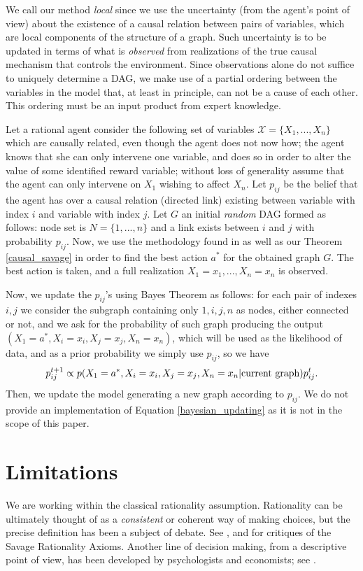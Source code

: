 \documentclass[review]{elsarticle}
\begin{document}
We call our method \textit{local} since we use the uncertainty (from the agent's point of view) about the existence of a causal relation between pairs of variables, which are local components of the structure of a graph. Such uncertainty is to be updated in terms of what is \textit{observed} from realizations of the true causal mechanism that controls the environment. Since observations alone do not suffice to uniquely determine a DAG, we make use of a partial ordering between the variables in the model that, at least in principle, can not be a cause of each other. This ordering must be an input product from expert knowledge.

Let a rational agent consider the following set of variables $\mathcal{X}=\{ X_1,...,X_n \}$ which are causally related, even though the agent does not now how; the agent knows that she can only intervene one variable, and does so in order to alter the value of some  identified reward variable; without loss of generality assume that the agent can only intervene on $X_1$ wishing to affect $X_n$. Let $p_{ij}$ be the belief that the agent has over a causal relation (directed link) existing between variable with index $i$ and variable with index $j$. Let $G$ an initial {\em random} DAG formed as follows: node set is $N=\{1,...,n\}$ and a link exists between $i$ and $j$ with probability $p_{ij}$. Now, we use the methodology found in \cite{gonzalez2018playing}  as well as our Theorem \ref{causal_savage} in order to find the best action $a^\ast$ for the obtained graph $G$. The best action is taken, and a full realization $X_1=x_1,...,X_n=x_n$ is observed.

Now, we update the $p_{ij}$'s using Bayes Theorem as follows: for each pair of indexes $i,j$ we consider the subgraph containing only $1,i,j,n$ as nodes, either connected or not, and we ask for the probability of such graph producing the output $(X_1 = a^\ast, X_i = x_i, X_j=x_j, X_n=x_n)$, which will be used as the likelihood of data, and as a prior probability we simply use $p_{ij}$, so we have
\begin{equation}{\label{bayesian_updating}}
p_{ij}^{t+1} \propto p(X_1 = a^\ast, X_i = x_i, X_j=x_j, X_n=x_n | \textrm{current graph})p_{ij}^t.
\end{equation}
Then, we update the model generating a new graph according to $p_{ij}$. We do not provide an implementation of Equation \ref{bayesian_updating} as it is not in the scope of this paper.

\section{Limitations}
\label{limitations}
We are working within the classical rationality assumption. Rationality can be ultimately thought of as a \textit{consistent} or coherent way of making choices, but the precise definition has been a subject of debate. See \cite{ellsberg1961risk}, \cite{gilboa2009decision} and \cite{machina2014ambiguity} for critiques of the Savage Rationality Axioms. Another line of decision making, from a descriptive point of view, has been developed by psychologists and economists; see \cite{TverskyKahneman74,kahneman1979prospect,kahneman2000choices}.
\end{document}
